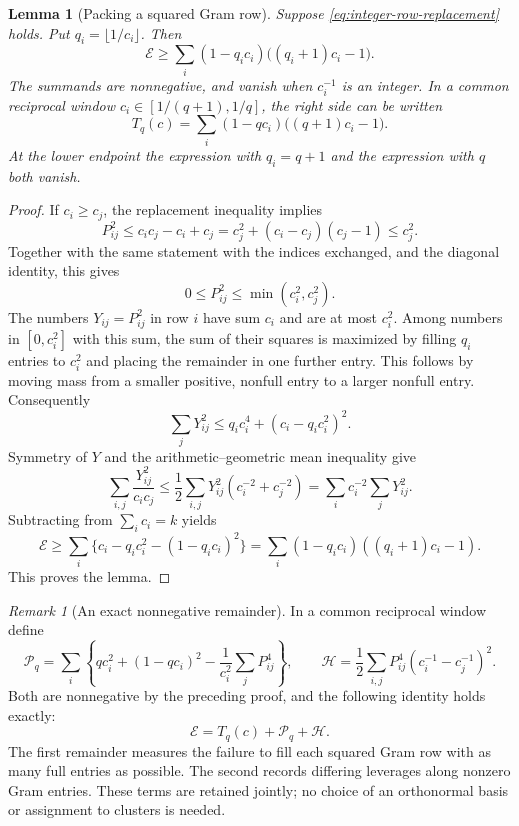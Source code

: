 \documentclass[11pt,a4paper]{article}
\newtheorem{lemma}[theorem]{Lemma}
\theoremstyle{remark}\newtheorem{remark}[theorem]{Remark}
\numberwithin{equation}{section}
\begin{document}
\begin{lemma}[Packing a squared Gram row]
\label{lem:integer-gram-packing}
Suppose \eqref{eq:integer-row-replacement} holds.  Put
$q_i=\lfloor1/c_i\rfloor$.  Then
\[
 \boxed{\quad
 \mathcal E\ge
 \sum_i(1-q_i c_i)\bigl((q_i+1)c_i-1\bigr).
 \quad}
\]
The summands are nonnegative, and vanish when $c_i^{-1}$ is an integer.
In a common reciprocal window $c_i\in[1/(q+1),1/q]$, the right side can
be written
\[
 T_q(c)=\sum_i(1-qc_i)\bigl((q+1)c_i-1\bigr).
\]
At the lower endpoint the expression with $q_i=q+1$ and the expression
with $q$ both vanish.
\end{lemma}
\begin{proof}
If $c_i\ge c_j$, the replacement inequality implies
\[
 P_{ij}^2\le c_i c_j-c_i+c_j
 =c_j^2+(c_i-c_j)(c_j-1)\le c_j^2.
\]
Together with the same statement with the indices exchanged, and the
diagonal identity, this gives
\[
 0\le P_{ij}^2\le\min(c_i^2,c_j^2).
\]
The numbers $Y_{ij}=P_{ij}^2$ in row $i$ have sum $c_i$ and are at most
$c_i^2$.  Among numbers in $[0,c_i^2]$ with this sum, the sum of their
squares is maximized by filling $q_i$ entries to $c_i^2$ and placing
the remainder in one further entry.  This follows by moving mass
from a smaller positive, nonfull entry to a larger nonfull entry.
Consequently
\[
 \sum_jY_{ij}^2\le q_i c_i^4+(c_i-q_i c_i^2)^2.
\]
Symmetry of $Y$ and the arithmetic--geometric mean inequality give
\[
 \sum_{i,j}\frac{Y_{ij}^2}{c_i c_j}
 \le \frac12\sum_{i,j}Y_{ij}^2(c_i^{-2}+c_j^{-2})
 =\sum_i c_i^{-2}\sum_jY_{ij}^2.
\]
Subtracting from $\sum_i c_i=k$ yields
\[
 \mathcal E\ge\sum_i\{c_i-q_i c_i^2-(1-q_i c_i)^2\}
 =\sum_i(1-q_i c_i)((q_i+1)c_i-1).
\]
This proves the lemma.
\end{proof}

\begin{remark}[An exact nonnegative remainder]
\label{rem:integer-exact-remainder}
In a common reciprocal window define
\[
 \mathcal P_q=
 \sum_i\left\{q c_i^2+(1-qc_i)^2
                     -\frac1{c_i^2}\sum_jP_{ij}^4\right\},
 \qquad
 \mathcal H=
 \frac12\sum_{i,j}P_{ij}^4(c_i^{-1}-c_j^{-1})^2.
\]
Both are nonnegative by the preceding proof, and the following identity
holds exactly:
\begin{equation}\label{eq:integer-exact-production-remainder}
 \boxed{\mathcal E=T_q(c)+\mathcal P_q+\mathcal H.}
\end{equation}
The first remainder measures the failure to fill each squared Gram row
with as many full entries as possible.  The second records differing
leverages along nonzero Gram entries.  These terms are retained jointly;
no choice of an orthonormal basis or assignment to clusters is needed.
\end{remark}
\end{document}
